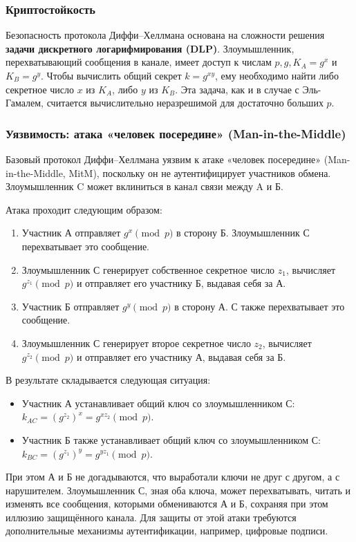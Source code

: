 \subsubsection{Криптостойкость}
Безопасность протокола Диффи–Хеллмана основана на сложности решения \textbf{задачи дискретного логарифмирования (DLP)}. Злоумышленник, перехватывающий сообщения в канале, имеет доступ к числам $p, g, K_A = g^x$ и $K_B = g^y$. Чтобы вычислить общий секрет $k = g^{xy}$, ему необходимо найти либо секретное число $x$ из $K_A$, либо $y$ из $K_B$. Эта задача, как и в случае с Эль-Гамалем, считается вычислительно неразрешимой для достаточно больших $p$.

\subsubsection{Уязвимость: атака «человек посередине» (Man-in-the-Middle)}
Базовый протокол Диффи–Хеллмана уязвим к атаке «человек посередине» (Man-in-the-Middle, MitM), поскольку он не аутентифицирует участников обмена. Злоумышленник C может вклиниться в канал связи между A и Б.

Атака проходит следующим образом:
\begin{enumerate}
    \item Участник А отправляет $g^x \pmod p$ в сторону Б. Злоумышленник С перехватывает это сообщение.
    \item Злоумышленник С генерирует собственное секретное число $z_1$, вычисляет $g^{z_1} \pmod p$ и отправляет его участнику Б, выдавая себя за А.
    \item Участник Б отправляет $g^y \pmod p$ в сторону А. С также перехватывает это сообщение.
    \item Злоумышленник С генерирует второе секретное число $z_2$, вычисляет $g^{z_2} \pmod p$ и отправляет его участнику А, выдавая себя за Б.
\end{enumerate}
В результате складывается следующая ситуация:
\begin{itemize}
    \item Участник А устанавливает общий ключ со злоумышленником С: $k_{AC} = (g^{z_2})^x = g^{xz_2} \pmod p$.
    \item Участник Б также устанавливает общий ключ со злоумышленником С: $k_{BC} = (g^{z_1})^y = g^{yz_1} \pmod p$.
\end{itemize}
При этом А и Б не догадываются, что выработали ключи не друг с другом, а с нарушителем. Злоумышленник С, зная оба ключа, может перехватывать, читать и изменять все сообщения, которыми обмениваются А и Б, сохраняя при этом иллюзию защищённого канала. Для защиты от этой атаки требуются дополнительные механизмы аутентификации, например, цифровые подписи.